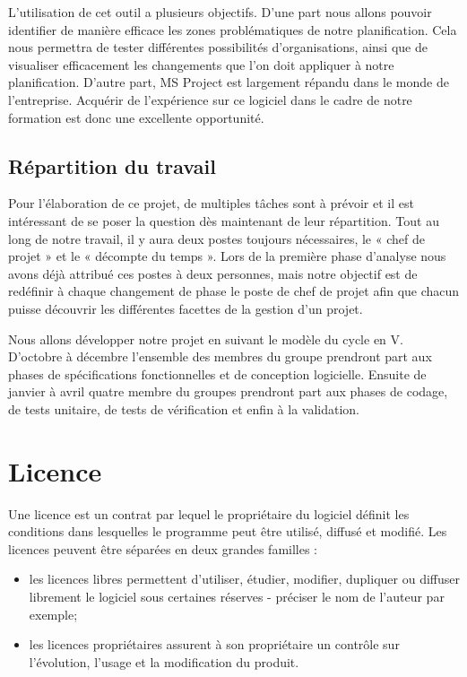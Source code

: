 	L'utilisation de cet outil a plusieurs objectifs. D'une part nous allons pouvoir identifier de manière efficace les zones problématiques de notre planification. Cela nous permettra de tester différentes possibilités d'organisations, ainsi que de visualiser efficacement les changements que l'on doit appliquer à notre planification. D'autre part, MS Project est largement répandu dans le monde de l'entreprise.  Acquérir de l'expérience sur ce logiciel dans le cadre de notre formation est donc une excellente opportunité.


\subsection{Répartition du travail}
	Pour l'élaboration de ce projet, de multiples tâches sont à prévoir et il est intéressant de se poser la question dès maintenant de leur répartition. Tout au long de notre travail, il y aura deux postes toujours nécessaires, le « chef de projet » et le « décompte du temps ». Lors de la première phase d'analyse nous avons déjà attribué ces postes à deux personnes, mais notre objectif est de redéfinir à chaque changement de phase le poste de chef de projet afin que chacun puisse découvrir les différentes facettes de la gestion d'un projet.  

	Nous allons développer notre projet en suivant le modèle du cycle en V. D'octobre à décembre l'ensemble des membres du groupe prendront part aux phases de spécifications fonctionnelles et de conception logicielle. Ensuite de janvier à avril quatre membre du groupes prendront part aux phases de codage, de tests unitaire, de tests de vérification et enfin à la validation.


\section{Licence}

	Une licence est un contrat par lequel le propriétaire du logiciel définit les conditions dans lesquelles le programme peut être utilisé, diffusé et modifié. Les licences peuvent être séparées en deux grandes familles :
	\begin{itemize}
		\item les licences libres permettent d'utiliser, étudier, modifier, dupliquer ou diffuser librement le logiciel sous certaines réserves - préciser le nom de l'auteur par exemple;
		\item les licences propriétaires assurent à son propriétaire un contrôle sur l'évolution, l'usage et la modification du produit.
	\end{itemize}

